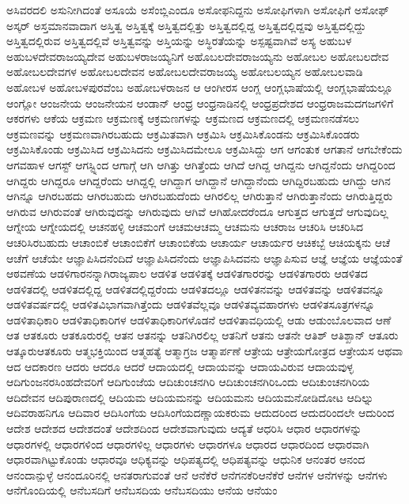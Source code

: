 {ಅಸಿವರದಲಿ
ಅಸುನೀಗಿದಂತೆ
ಅಸೂಯೆ
ಅಸೆಂಬ್ಲಿಎಂದೂ
ಅಸೋಫನಿದ್ದನು
ಅಸೋಫಿಗಳಾಗಿ
ಅಸೋಫಿಗೆ
ಅಸೋಫ್
ಅಸ್ಕರ್
ಅಸ್ತಮಾನವಾದಾಗ
ಅಸ್ತಿತ್ವ
ಅಸ್ತಿತ್ವಕ್ಕೆ
ಅಸ್ತಿತ್ವದಲ್ಲಿತ್ತು
ಅಸ್ತಿತ್ವದಲ್ಲಿದ್ದ
ಅಸ್ತಿತ್ವದಲ್ಲಿದ್ದವು
ಅಸ್ತಿತ್ವದಲ್ಲಿದ್ದು
ಅಸ್ತಿತ್ವದಲ್ಲಿರುವ
ಅಸ್ತಿತ್ವದಲ್ಲಿವೆ
ಅಸ್ತಿತ್ವವನ್ನು
ಅಸ್ತಿಯನ್ನು
ಅಸ್ಥಿರತೆಯನ್ನು
ಅಸ್ಪಷ್ಟವಾಗಿವೆ
ಅಸ್ಯ
ಅಹುಬಳ
ಅಹುಬಳದೇವರಾಜಯ್ಯದೇವ
ಅಹುಬಳರಾಜಯ್ಯನಿಗೆ
ಅಹೊಬಲದೇವರಾಜಯ್ಯನು
ಅಹೋಬಲ
ಅಹೋಬಲದೇವ
ಅಹೋಬಲದೇವಗಳ
ಅಹೋಬಲದೇವನ
ಅಹೋಬಲದೇವರಾಜಯ್ಯ
ಅಹೋಬಲಯ್ಯನ
ಅಹೋಬಲವಾಡಿ
ಅಹೋಬಳ
ಅಹೋಬಳಪುರವೆಂಬ
ಅಹೋಬಳರಾಜನ
ಆ
ಆಂಗೀರಸ
ಆಂಗ್ಲ
ಆಂಗ್ಲಭಾಷೆಯಲ್ಲಿ
ಆಂಗ್ಲಭಾಷೆಯಲ್ಲೂ
ಆಂಗ್ಲೋ
ಆಂಜನೇಯ
ಆಂಜನೇಯನ
ಆಂಡಾನ್
ಆಂಧ್ರ
ಆಂಧ್ರನಾಡಿನಲ್ಲಿ
ಆಂಧ್ರಪ್ರದೇಶದ
ಆಂಧ್ರರಾಜಮದಗಜಗಳಿಗೆ
ಆಕರಗಳು
ಆಕೆಯ
ಆಕ್ರಮಣ
ಆಕ್ರಮಣಕ್ಕೆ
ಆಕ್ರಮಣಗಳನ್ನು
ಆಕ್ರಮಣದ
ಆಕ್ರಮಣದಲ್ಲಿ
ಆಕ್ರಮಣನಡೆಸಲು
ಆಕ್ರಮಣವನ್ನು
ಆಕ್ರಮಣವಾಗಿರಬಹುದು
ಆಕ್ರಮಿತವಾಗಿ
ಆಕ್ರಮಿಸಿ
ಆಕ್ರಮಿಸಿಕೊಂಡನು
ಆಕ್ರಮಿಸಿಕೊಂಡರು
ಆಕ್ರಮಿಸಿಕೊಂಡು
ಆಕ್ರಮಿಸಿದ
ಆಕ್ರಮಿಸಿದನು
ಆಕ್ರಮಿಸಿದಮೇಲೂ
ಆಕ್ರಮಿಸಿದ್ದು
ಆಗ
ಆಗಂತುಕ
ಆಗತಾನೆ
ಆಗಬೇಕೆಂದು
ಆಗವಹಾಳ
ಆಗಸ್ಟ್
ಆಗಸ್ಟ್ನಿಂದ
ಆಗಾಗ್ಗೆ
ಆಗಿ
ಆಗಿತ್ತು
ಆಗಿತ್ತೆಂದು
ಆಗಿದೆ
ಆಗಿದ್ದ
ಆಗಿದ್ದನು
ಆಗಿದ್ದನೆಂದು
ಆಗಿದ್ದರಿಂದ
ಆಗಿದ್ದರು
ಆಗಿದ್ದರೂ
ಆಗಿದ್ದರೆಂದು
ಆಗಿದ್ದಲ್ಲಿ
ಆಗಿದ್ದಾಗ
ಆಗಿದ್ದಾನೆ
ಆಗಿದ್ದಾನೆಂದು
ಆಗಿದ್ದಿರಬಹುದು
ಆಗಿದ್ದು
ಆಗಿನ
ಆಗಿನ್ನೂ
ಆಗಿರಬಹದು
ಆಗಿರಬಹುದು
ಆಗಿರಬಹುದೆಂದು
ಆಗಿರಲಿಲ್ಲ
ಆಗಿರುತ್ತಾನೆ
ಆಗಿರುತ್ತಾನೆಂದು
ಆಗಿರುತ್ತಿದ್ದರು
ಆಗಿರುವ
ಆಗಿರುವಂತೆ
ಆಗಿರುವುದನ್ನು
ಆಗಿರುವುದು
ಆಗಿವೆ
ಆಗಿಹೋದರೆಂದೂ
ಆಗುತ್ತದ
ಆಗುತ್ತದೆ
ಆಗುವುದಿಲ್ಲ
ಆಗ್ನೇಯ
ಆಗ್ನೇಯದಲ್ಲಿ
ಆಚನಹಳ್ಳಿ
ಆಚಮಂಗೆ
ಆಚಮಆಚಮ್ಮ
ಆಚಮನು
ಆಚರಾಜ
ಆಚರಿಸಿ
ಆಚರಿಸಿದ
ಆಚರಿಸಿರಬಹುದು
ಆಚಾಂಬಿಕೆ
ಆಚಾಂಬಿಕೆಗೆ
ಆಚಾಂಬಿಕೆಯ
ಆಚಾರ್ಯ
ಆಚಾರ್ಯರ
ಆಚಿಕಬ್ಬೆ
ಆಚಿಯಕ್ಕನು
ಆಚೆ
ಆಚೆಗೆ
ಆಚೆಯೇ
ಆಜ್ಞಾಪಿಸಿದನೆಂದಿದೆ
ಆಜ್ಞಾಪಿಸಿದನೆಂದು
ಆಜ್ಞಾಪಿಸಿದವನು
ಆಜ್ಞಾಪಿಸುವ
ಆಜ್ಞೆ
ಆಜ್ಞೆಯ
ಆಜ್ಞೆಯಂತೆ
ಆಠವಣೆಯ
ಆಡಳಿಗಾರನನ್ನಾಗಿರಾಜ್ಯಪಾಲ
ಆಡಳಿತ
ಆಡಳಿತಕ್ಕೆ
ಆಡಳಿತಗಾರರನ್ನು
ಆಡಳಿತಗಾರರು
ಆಡಳಿತದ
ಆಡಳಿತದಲ್ಲಿ
ಆಡಳಿತದಲ್ಲಿದ್ದ
ಆಡಳಿತದಲ್ಲಿದ್ದರೆಂದು
ಆಡಳಿತದಲ್ಲೂ
ಆಡಳಿತನವನ್ನು
ಆಡಳಿತವನ್ನು
ಆಡಳಿತವನ್ನೂ
ಆಡಳಿತವರ್ಷದಲ್ಲಿ
ಆಡಳಿತವಿಭಾಗವಾಗಿತ್ತೆಂದು
ಆಡಳಿತವೆಲ್ಲವೂ
ಆಡಳಿತವ್ಯವಹಾರಗಳು
ಆಡಳಿತಸೂತ್ರಗಳನ್ನೂ
ಆಡಳಿತಾಧಿಕಾರಿ
ಆಡಳಿತಾಧಿಕಾರಿಗಳ
ಆಡಳಿತಾಧಿಕಾರಿಗಳೊಡನೆ
ಆಡಳಿತಾವಧಿಯಲ್ಲಿ
ಆಡು
ಆಡುಂಬೊಲವಾದ
ಆಣೆ
ಆತ
ಆತಕೂರು
ಆತಕೂರುರಲ್ಲಿ
ಆತನ
ಆತನನ್ನು
ಆತನಿಗಿರಲಿಲ್ಲ
ಆತನಿಗೆ
ಆತನು
ಆತನೇ
ಆತಿಶ್
ಆತಿಶ್ಖಾನ್
ಆತೂರು
ಆತ್ಕೂರುಆತಕೂರು
ಆತ್ಮಭಕ್ತಿಯಿಂದ
ಆತ್ಮಹತ್ಯೆ
ಆತ್ಮಾಗ್ರಜ
ಆತ್ಮಾರ್ಪಣೆ
ಆತ್ರೇಯ
ಆತ್ರೇಯಗೋತ್ರದ
ಆತ್ರೇಯಸ
ಆಥವಾ
ಆದ
ಆದಕಾರಣ
ಆದರು
ಆದರೂ
ಆದರೆ
ಆದಾಯದಲ್ಲಿ
ಆದಾಯವನ್ನು
ಆದಾಯವಿರುವ
ಆದಾಯವುಳ್ಳ
ಆದಿಗುಂಜನರಸಿಂಹದೇವರಿಗೆ
ಆದಿಗುಂಜೆಯ
ಆದಿಚುಂಚನಗಿರಿ
ಆದಿಚುಂಚನಗಿರಿಒಂದು
ಆದಿಚುಂಚನಗಿರಿಯ
ಆದಿದೇವನ
ಆದಿಪುರಾಣದಲ್ಲಿ
ಆದಿಯಮ
ಆದಿಯಮನನ್ನು
ಆದಿಯಮನು
ಆದಿಯಮನೋಡಿದೋಟ
ಆದಿಲ್ನು
ಆದಿವರಾಹನಿಗೂ
ಆದಿವಾರ
ಆದಿಸಿಂಗೆಯ
ಆದಿಸಿಂಗೆಯದಣ್ಣಾಯಕರುಮ
ಆದುದರಿಂದ
ಆದುದರಿಂದಲೇ
ಆದುರಿಂದ
ಆದೇಶ
ಆದೇಶದ
ಆದೇಶದಂತೆ
ಆದೇಶದಿಂದ
ಆದೇಶವಾಗುವುದು
ಆದ್ಯತೆ
ಆಧರಿಸಿ
ಆಧಾರ
ಆಧಾರಗಳನ್ನು
ಆಧಾರಗಳಲ್ಲಿ
ಆಧಾರಗಳಿಂದ
ಆಧಾರಗಳಿಲ್ಲ
ಆಧಾರಗಳು
ಆಧಾರಗಳೂ
ಆಧಾರದ
ಆಧಾರದಿಂದ
ಆಧಾರವಾಗಿ
ಆಧಾರವಾಗಿಟ್ಟುಕೊಂಡು
ಆಧಾರವೂ
ಆಧಿಕ್ಯವನ್ನು
ಆಧಿಪತ್ಯದಲ್ಲಿ
ಆಧಿಪತ್ಯವನ್ನು
ಆಧುನಿಕ
ಆನಂತರ
ಆನಂದ
ಆನಂದಾನ್ಪುಳ್ಳೆ
ಆನಂದೂರಿನಲ್ಲಿ
ಆನತರಾಗುವಂತೆ
ಆನೆ
ಆನೆಕೆರೆ
ಆನೆಗನಕೆರಿಆನೆಕೆರೆ
ಆನೆಗಳ
ಆನೆಗಳನ್ನು
ಆನೆಗಳು
ಆನೆಗೊಂದಿಯಲ್ಲಿ
ಆನೆಬಸದಿಗೆ
ಆನೆಬಸದಿಯ
ಆನೆಬಸದಿಯು
ಆನೆಯ
ಆನೆಯಂ
}
